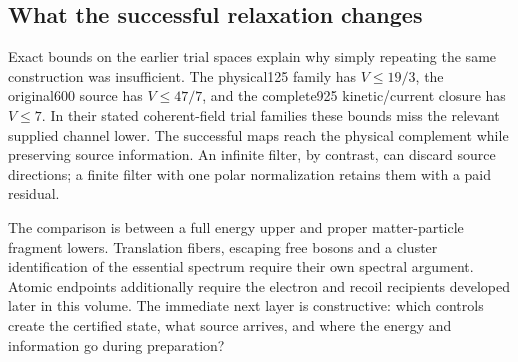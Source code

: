 \subsection{What the successful relaxation changes}

Exact bounds on the earlier trial spaces explain why simply repeating the
same construction was insufficient. The physical125 family has $V\leq19/3$,
the original600 source has $V\leq47/7$, and the complete925 kinetic/current
closure has $V\leq7$. In their stated coherent-field trial families these
bounds miss the relevant supplied channel lower. The successful maps reach
the physical complement while preserving source information. An infinite
filter, by contrast, can discard source directions; a finite filter with
one polar normalization retains them with a paid residual.

The comparison is between a full energy upper and proper matter-particle
fragment lowers. Translation fibers, escaping free bosons and a cluster
identification of the essential spectrum require their own spectral
argument. Atomic endpoints additionally require the electron and recoil
recipients developed later in this volume. The immediate next layer is
constructive: which controls create the certified state, what source
arrives, and where the energy and information go during preparation?
